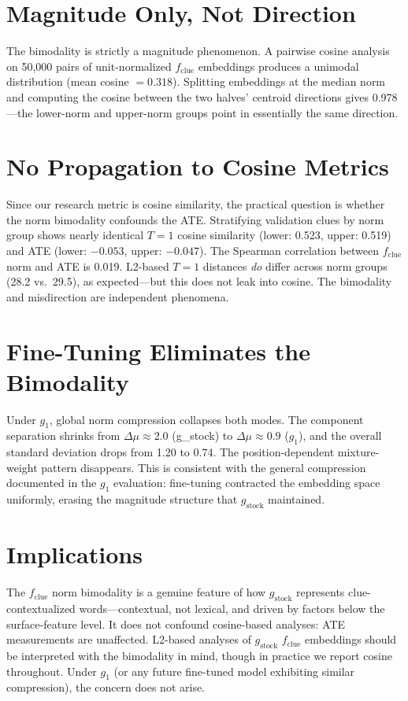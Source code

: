\documentclass[11pt]{article}
\begin{document}
\section*{Magnitude Only, Not Direction}

The bimodality is strictly a magnitude phenomenon. A pairwise cosine analysis
on 50,000 pairs of unit-normalized $f_\text{clue}$ embeddings produces a
unimodal distribution (mean cosine $= 0.318$). Splitting embeddings at the
median norm and computing the cosine between the two halves' centroid
directions gives 0.978---the lower-norm and upper-norm groups point in
essentially the same direction.

\section*{No Propagation to Cosine Metrics}

Since our research metric is cosine similarity, the practical question is
whether the norm bimodality confounds the ATE.  Stratifying validation clues
by norm group shows nearly identical $T\!=\!1$ cosine similarity (lower:
0.523, upper: 0.519) and ATE (lower: $-0.053$, upper: $-0.047$). The
Spearman correlation between $f_\text{clue}$ norm and ATE is 0.019. L2-based
$T\!=\!1$ distances \emph{do} differ across norm groups (28.2 vs.\ 29.5),
as expected---but this does not leak into cosine. The bimodality and
misdirection are independent phenomena.

\section*{Fine-Tuning Eliminates the Bimodality}

Under $g_1$, global norm compression collapses both modes. The component
separation shrinks from $\Delta\mu \approx 2.0$ (g\_stock) to
$\Delta\mu \approx 0.9$ ($g_1$), and the overall standard deviation drops
from 1.20 to 0.74. The position-dependent mixture-weight pattern disappears.
This is consistent with the general compression documented in the $g_1$
evaluation: fine-tuning contracted the embedding space uniformly, erasing
the magnitude structure that $g_\text{stock}$ maintained.

\section*{Implications}

The $f_\text{clue}$ norm bimodality is a genuine feature of how
$g_\text{stock}$ represents clue-contextualized words---contextual, not
lexical, and driven by factors below the surface-feature level. It does not
confound cosine-based analyses: ATE measurements are unaffected. L2-based
analyses of $g_\text{stock}$ $f_\text{clue}$ embeddings should be interpreted
with the bimodality in mind, though in practice we report cosine throughout.
Under $g_1$ (or any future fine-tuned model exhibiting similar compression),
the concern does not arise.
\end{document}
